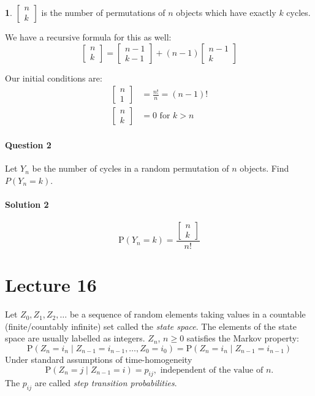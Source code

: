 \documentclass[english,12pt]{article}
\theoremstyle{plain}
\theoremstyle{definition}
\newtheorem*{definition}{\protect\definitionname}
\theoremstyle{definition} %
\newcommand{\defn}[1]{\begin{definition} #1 \end{definition} }
\providecommand{\definitionname}{Definition}
\begin{document}
\defn{
$\begin{bmatrix}
n\\
k
\end{bmatrix}$ is the number of permutations of $n$ objects which have exactly $k$ cycles.
}

We have a recursive formula for this as well:
\[\begin{bmatrix}
n\\
k
\end{bmatrix}=
\begin{bmatrix}
n-1\\
k-1
\end{bmatrix}+
(n-1)\begin{bmatrix}
n-1\\
k
\end{bmatrix}\]

Our initial conditions are:
\begin{align*}
\begin{bmatrix}
n\\
1
\end{bmatrix}&=\frac{n!}{n}
=(n-1)!\\
\begin{bmatrix}
n\\
k
\end{bmatrix}
&=0\text{ for }k>n
\end{align*}

\paragraph{Question 2} Let $Y_n$ be the number of cycles in a random permutation of $n$ objects.  Find $P(Y_n=k)$.

\paragraph{Solution 2}
\[\text{P}(Y_n=k)=\frac{\begin{bmatrix}
n\\
k
\end{bmatrix}}{n!}\]

\section*{Lecture 16}
Let $Z_0, Z_1, Z_2, \ldots$ be a sequence of random elements taking values in a countable (finite/countably infinite) set called the \emph{state space}. The elements of the state space are usually labelled as integers. $Z_n$, $n \geq 0$ satisfies the Markov property:
\[ \text{P}(Z_n = i_n \mid Z_{n-1} = i_{n-1}, \ldots, Z_0 = i_0) = \text{P}(Z_n = i_n \mid Z_{n-1} = i_{n-1}) \]
Under standard assumptions of time-homogeneity
\[ \text{P}(Z_n = j \mid Z_{n-1} = i) = p_{ij}, \text{ independent of the value of $n$.} \]
The $p_{ij}$ are called \emph{step transition probabilities}.
\end{document}
